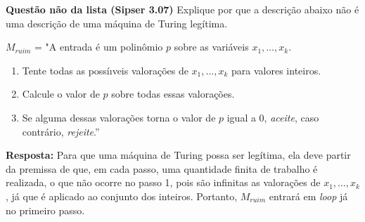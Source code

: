 
\noindent \textbf{Questão não da lista (Sipser 3.07)} Explique por que a descrição abaixo não é uma descrição de uma máquina de Turing legítima.

$M_{ruim}$ = "A entrada é um polinômio $p$ sobre as variáveis  $x_1, \ldots , x_k$.
\begin{enumerate}[label={\textbf{\arabic*.}}, leftmargin=1.05in]
\item Tente todas as possíıveis valorações  de $x_1, \ldots, x_k$ para valores inteiros.
\item Calcule o valor de $p$ sobre todas essas valorações.
\item Se alguma dessas valorações torna o valor de $p$ igual a 0, \textit{aceite}, caso contrário, \textit{rejeite}.”
\end{enumerate}

\textbf{Resposta:} Para que uma máquina de Turing possa ser legítima, ela deve partir da premissa de que, em cada passo, uma quantidade finita de trabalho é realizada, o que não ocorre no passo 1, pois são infinitas as valorações de $x_1, \ldots , x_k$, já que é aplicado ao conjunto dos inteiros. Portanto, $M_{ruim}$ entrará em \textit{loop} já no primeiro passo.